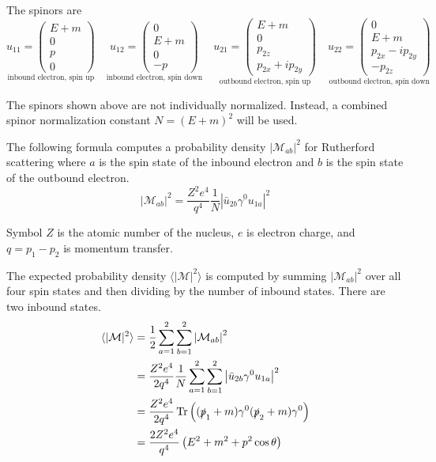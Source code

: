 \documentclass[12pt]{article}
\begin{document}
\bigskip
\noindent
The spinors are
\begin{equation*}
\underset{\text{inbound electron, spin up}}
{u_{11}=\begin{pmatrix}E+m\\0\\p\\0\end{pmatrix}}
\quad
\underset{\text{inbound electron, spin down}}
{u_{12}=\begin{pmatrix}0\\E+m\\0\\-p\end{pmatrix}}
\quad
\underset{\text{outbound electron, spin up}}
{u_{21}=\begin{pmatrix}E+m\\0\\p_{2z}\\p_{2x}+ip_{2y}\end{pmatrix}}
\quad
\underset{\text{outbound electron, spin down}}
{u_{22}=\begin{pmatrix}0\\E+m\\p_{2x}-ip_{2y}\\-p_{2z}\end{pmatrix}}
\end{equation*}

\noindent
The spinors shown above are not individually normalized.
Instead, a combined spinor normalization constant $N=(E+m)^2$ will be used.

\bigskip
\noindent
The following formula computes a probability density $|\mathcal{M}_{ab}|^2$ for Rutherford scattering
where $a$ is the spin state of the inbound electron and $b$ is the spin state of the outbound electron.
\begin{equation*}
|\mathcal{M}_{ab}|^2=\frac{Z^2e^4}{q^4}\frac{1}{N}\left|\bar{u}_{2b}\gamma^0 u_{1a}\right|^2
\end{equation*}

\noindent
Symbol $Z$ is the atomic number of the nucleus,
$e$ is electron charge,
and $q=p_1-p_2$ is momentum transfer.

\bigskip
\noindent
The expected probability density
$\langle\vert\mathcal{M}\vert^2\rangle$
is computed by summing $|\mathcal{M}_{ab}|^2$
over all four spin states and then dividing by the number of inbound states.
There are two inbound states.
\begin{align*}
\langle\vert\mathcal{M}\vert^2\rangle
&=\frac{1}{2}\sum_{a=1}^2\sum_{b=1}^2\left|\mathcal{M}_{ab}\right|^2
\\
&=\frac{Z^2e^4}{2q^4}\frac{1}{N}\sum_{a=1}^2\sum_{b=1}^2\left|\bar{u}_{2b}\gamma^0 u_{1a}\right|^2
\\
&=\frac{Z^2e^4}{2q^4}\mathop{\rm Tr}\left((\slashed{p}_1+m)\gamma^0(\slashed{p}_2+m)\gamma^0\right)
\\
&=\frac{2Z^2e^4}{q^4}\left(E^2+m^2+p^2\cos\theta\right)
\end{align*}
\end{document}
